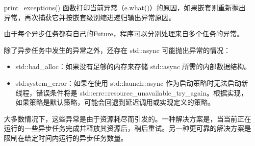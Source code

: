 print\_exceptions() 函数打印当前异常（e.what()）的原因，如果嵌套则重新抛出异常，再次捕获它并按嵌套级别缩进递归输出异常原因。

由于每个异步任务都有自己的Future，程序可以分别处理来自多个任务的异常。


除了异步任务中发生的异常之外，还存在 std::async 可能抛出异常的情况：

\begin{itemize}
\item
std::bad\_alloc：如果没有足够的内存来存储 std::async 所需的内部数据结构。

\item
std:system\_error：如果在使用 std::launch::async 作为启动策略时无法启动新线程，错误条件将是 std::errc::resource\_unavailable\_try\_again。根据实现，如果策略是默认策略，可能会回退到延迟调用或实现定义的策略。
\end{itemize}

大多数情况下，这些异常是由于资源耗尽而引发的。一种解决方案是，当当前正在运行的一些异步任务完成并释放其资源后，稍后重试。另一种更可靠的解决方案是限制在给定时间内运行的异步任务数量。
































